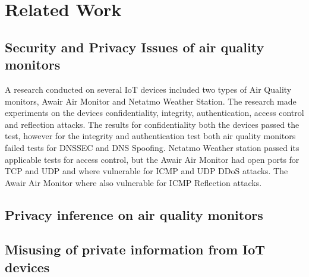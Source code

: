 \chapter*{Related Work}

\section*{Security and Privacy Issues of air quality monitors}
A research conducted on several IoT devices included two types of Air Quality monitors, Awair Air Monitor and Netatmo Weather Station. \cite{IoTSecurityandPrivacyImpl} The research made experiments on the devices confidentiality, integrity, authentication, access control and reflection attacks. The results for confidentiality both the devices passed the test, however for the integrity and authentication test both air quality monitors failed tests for DNSSEC and DNS Spoofing. Netatmo Weather station passed its applicable tests for access control, but the Awair Air Monitor had open ports for TCP and UDP and where vulnerable for ICMP and UDP DDoS attacks. The Awair Air Monitor where also vulnerable for ICMP Reflection attacks. \cite{IoTSecurityandPrivacyImpl}

\section*{Privacy inference on air quality monitors}

\section*{Misusing of private information from IoT devices}
